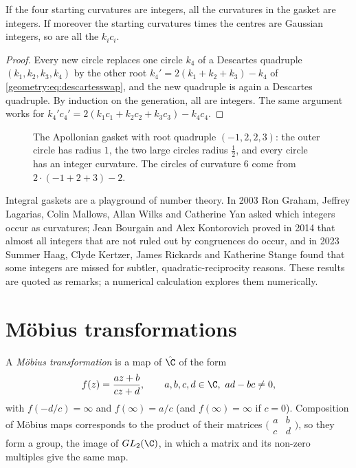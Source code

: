 \begin{corollary}\label{geometry:cor:integral}
If the four starting curvatures are integers, all the curvatures in the gasket are integers. If moreover the starting curvatures times
the centres are Gaussian integers, so are all the $k_ic_i$.
\end{corollary}
\begin{proof}
Every new circle replaces one circle $k_4$ of a Descartes quadruple $(k_1,k_2,k_3,k_4)$ by the other root $k_4'=2(k_1+k_2+k_3)-k_4$ of
\eqref{geometry:eq:descartesswap}, and the new quadruple is again a Descartes quadruple. By induction on the generation, all are integers. The same
argument works for $k_4'c_4'=2(k_1c_1+k_2c_2+k_3c_3)-k_4c_4$.
\end{proof}

\begin{figure}[ht]
\centering
{}
\caption{The Apollonian gasket with root quadruple $(-1,2,2,3)$: the outer circle has radius $1$, the two large circles radius $\frac12$, and every
circle has an integer curvature. The circles of curvature $6$ come from $2\cdot(-1+2+3)-2$.}
\label{geometry:fig:gasket}
\end{figure}

Integral gaskets are a playground of number theory. In 2003 Ron Graham, Jeffrey Lagarias, Colin Mallows, Allan Wilks and Catherine Yan
asked which integers occur as curvatures; Jean Bourgain and Alex Kontorovich proved in 2014 that almost all integers that are not ruled out by
congruences do occur, and in 2023 Summer Haag, Clyde Kertzer, James Rickards and Katherine Stange found that some integers are missed for
subtler, quadratic-reciprocity reasons. These results are quoted as remarks; a numerical calculation explores them numerically.

\section{M\"obius transformations}

A \emph{M\"obius transformation} is a map of $\hat{\C}$ of the form
\[
f(z)=\frac{az+b}{cz+d},\qquad a,b,c,d\in\C,\ ad-bc\ne0,
\]
with $f(-d/c)=\infty$ and $f(\infty)=a/c$ (and $f(\infty)=\infty$ if $c=0$). Composition of M\"obius maps corresponds to the product of their
matrices $\bigl(\begin{smallmatrix}a&b\\c&d\end{smallmatrix}\bigr)$, so they form a group, the image of $GL_2(\C)$, in which a matrix and its non-zero
multiples give the same map.

